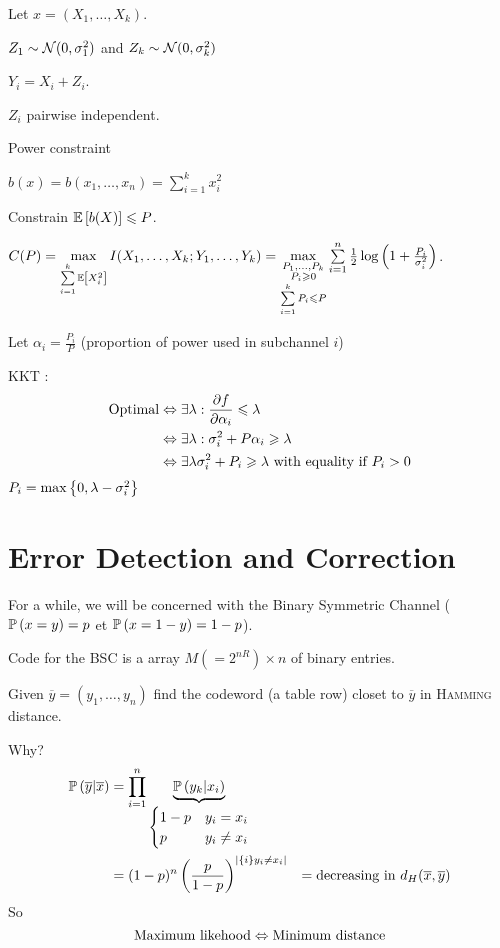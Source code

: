 Let $x = (X_1,\ldots,X_k)$.

$Z_1 \sim\mathcal{N}(0,\sigma_1^2)$ and  $Z_k \sim\mathcal{N}(0,\sigma_k^2)$

$Y_i = X_i + Z_i$.

$Z_i$ pairwise independent.

Power constraint

$b(x) = b(x_1,\ldots,x_n) = \sum\limits_{i=1}^k x_i^2$

Constrain $\mathbb{E}\left[ b(X) \right] \leqslant P$.

$C(P) = \max\limits_{\sum\limits_{i=1}^k \mathbb{E}\left[ X_i^2 \right]} I(X_1,\ldots,X_k ; Y_1,\ldots, Y_k) = \max\limits_{\substack{P_1,\ldots,P_k\\P_i \geqslant 0\\\sum\limits_{i=1}^k P_i \leqslant P}} \sum\limits_{i=1}^n\frac{1}{2} \log\left(1+\frac{P_i}{\sigma_i^2}\right)$.

Let $\alpha_i=\frac{P_i}{P}$ (proportion of power used in subchannel $i$)

KKT : 
\[
    \begin{aligned}
        \text{Optimal} &\Leftrightarrow \exists \lambda: \frac{\partial f}{\partial \alpha_i} \leqslant\lambda\\
        &\Leftrightarrow \exists \lambda : \sigma_i^2+P\alpha_i \geqslant \lambda\\
        &\Leftrightarrow \exists \lambda \sigma_i^2+P_i \geqslant \lambda \text{ with equality if }P_i > 0
    \end{aligned}
\]
$P_i = \max\left\{ 0,\lambda - \sigma_i^2 \right\}$

\section{Error Detection and Correction}

For a while, we will be concerned with the Binary Symmetric Channel  ($\mathbb{P}\left( x=y \right) = p$ et $\mathbb{P}\left( x=1-y \right) = 1-p$).

Code for the BSC is a array $M (=2^{nR}) \times n$ of binary entries.

Given $\overline{y} = (y_1,\ldots,y_n)$ find the codeword (a table row) closet to $\overline{y}$ in \textsc{Hamming} distance.

Why?
\[
    \begin{aligned}
        \mathbb{P}\left( \overline{y}\vert \overline{x} \right) &= \prod\limits_{i=1}^n \underbrace{\mathbb{P}\left( y_k \vert x_i \right)}_{\begin{cases}1-p & y_i = x_i\\p & y_i \neq x_i\end{cases}}\\
        &= (1-p)^n \left( \frac{p}{1-p} \right)^{\left\lvert\left\{ i \right\}{y_i\neq x_i}\right\rvert}
        &= \text{decreasing in }d_H(\overline{x},\overline{y})
    \end{aligned}
\]
So
\[
    \text{Maximum likehood} \Leftrightarrow \text{Minimum distance}
\]

